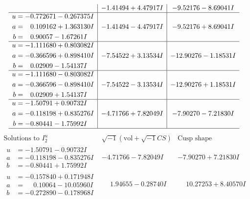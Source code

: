 \documentclass[1p]{elsarticle_modified}
\theoremstyle{definition}
\newcommand{\I}{\sqrt{-1}}
\begin{document}
$$\begin{array}{c|c|c}
 & -1.41494 + 4.47917 I & -9.52176 - 8.69041 I \\ \hline\begin{aligned}
u &= -0.772671 - 0.267375 I \\
a &= \phantom{-}0.109162 + 1.363130 I \\
b &= \phantom{-}0.90057 - 1.67261 I\end{aligned}
 & -1.41494 - 4.47917 I & -9.52176 + 8.69041 I \\ \hline\begin{aligned}
u &= -1.111680 + 0.803082 I \\
a &= -0.366596 + 0.898410 I \\
b &= \phantom{-}0.02909 - 1.54137 I\end{aligned}
 & -7.54522 + 3.13534 I & -12.90276 - 1.18531 I \\ \hline\begin{aligned}
u &= -1.111680 - 0.803082 I \\
a &= -0.366596 - 0.898410 I \\
b &= \phantom{-}0.02909 + 1.54137 I\end{aligned}
 & -7.54522 - 3.13534 I & -12.90276 + 1.18531 I \\ \hline\begin{aligned}
u &= -1.50791 + 0.90732 I \\
a &= -0.118198 + 0.835276 I \\
b &= -0.80441 - 1.75992 I\end{aligned}
 & -4.71766 + 7.82049 I & -7.90270 - 7.21830 I\\
 \hline 
 \end{array}$$\newpage$$\begin{array}{c|c|c}  
\text{Solutions to }I^u_{2}& \I (\text{vol} + \sqrt{-1}CS) & \text{Cusp shape}\\
 \hline 
\begin{aligned}
u &= -1.50791 - 0.90732 I \\
a &= -0.118198 - 0.835276 I \\
b &= -0.80441 + 1.75992 I\end{aligned}
 & -4.71766 - 7.82049 I & -7.90270 + 7.21830 I \\ \hline\begin{aligned}
u &= -0.157840 + 0.171948 I \\
a &= \phantom{-}0.10064 - 10.05960 I \\
b &= -0.272890 - 0.178968 I\end{aligned}
 & \phantom{-}1.94655 - 0.28740 I & \phantom{-}10.27253 + 8.40570 I \\ \hline\begin{aligned}

\end{aligned}
\end{array}$$
\end{document}
